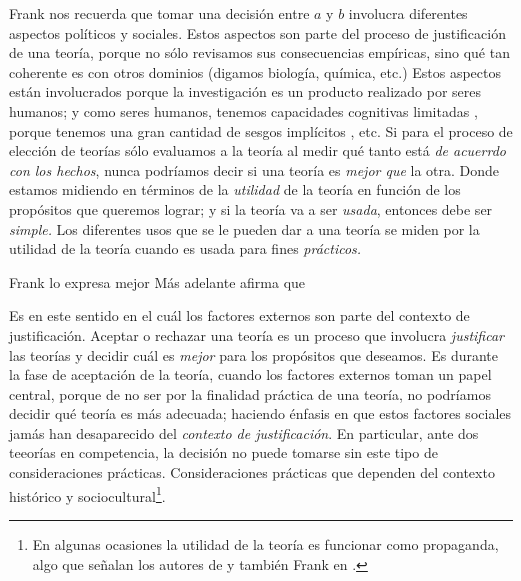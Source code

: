 Frank nos recuerda que tomar una decisión entre $a$ y $b$ involucra diferentes aspectos políticos y sociales.
Estos aspectos son parte del proceso de justificación de una teoría, porque no sólo revisamos sus consecuencias empíricas, sino qué tan coherente es con otros dominios (digamos biología, química, etc.)
Estos aspectos están involucrados porque la investigación es un producto realizado por seres humanos;
y como seres humanos, tenemos capacidades cognitivas limitadas \parencite{Potochnik2017-POTIAT-3}, porque tenemos una gran cantidad de sesgos implícitos \parencite{nordell2021end}, etc.
Si para el proceso de elección de teorías sólo evaluamos a la teoría al medir qué tanto está \emph{de acuerrdo con los hechos}, nunca podríamos decir si una teoría es \emph{mejor que} la otra.
Donde estamos midiendo  en términos de la \emph{utilidad} de la teoría en función de los propósitos que queremos lograr;
y si la teoría va a ser \emph{usada}, entonces debe ser \emph{simple.}
Los diferentes usos que se le pueden dar a una teoría se miden por la utilidad de la teoría cuando es usada para fines \emph{prácticos.}

Frank lo expresa mejor  \parencite[p.~4]{Frank1956}
Más adelante afirma que  

Es en este sentido en el cuál los factores externos son parte del contexto de justificación.
Aceptar o rechazar una teoría es un proceso que involucra \emph{justificar} las teorías y decidir cuál es \emph{mejor} para los propósitos que deseamos.
Es durante la fase de aceptación de la teoría, cuando los factores externos toman un papel central, porque de no ser por la finalidad práctica de una teoría, no podríamos decidir qué teoría es más adecuada; 
haciendo énfasis en que estos factores sociales jamás han desaparecido del \emph{contexto de justificación}.
En particular, ante dos teeorías en competencia, la decisión no puede tomarse sin este tipo de consideraciones prácticas.
Consideraciones prácticas que dependen del contexto histórico y sociocultural\footnote{En algunas ocasiones la utilidad de la teoría es funcionar como propaganda, algo que señalan los autores de \parencite{Lewontin2017}  y también Frank en \parencite{}.}.

